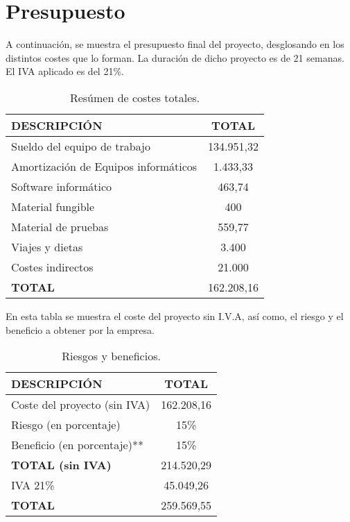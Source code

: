 \section{Presupuesto}

\par A continuación, se muestra el presupuesto final del proyecto, desglosando en los distintos costes que lo forman. La duración de dicho proyecto es de 21 semanas. El IVA aplicado es del 21\%.



\begin{table}[H]
\begin{center}
\begin{tabular}{l c}
\textbf{DESCRIPCIÓN} & \textbf{TOTAL}\\ \hline \hline
Sueldo del equipo de trabajo & 134.951,32\\
Amortización de Equipos informáticos & 1.433,33\\
Software informático & 463,74\\
Material fungible & 400\\
Material de pruebas & 559,77\\
Viajes y dietas & 3.400\\
Costes indirectos & 21.000\\ \hline \hline
\textbf{TOTAL} & 162.208,16\\ \hline
\end{tabular}
\caption{Resúmen de costes totales.}
\label{tab:resumenTotal}
\end{center}
\end{table}

En esta tabla se muestra el coste del proyecto sin I.V.A, así como, el riesgo y el beneficio a obtener por la empresa.
\begin{table}[H]
\begin{center}
\begin{tabular}{l c}
\textbf{DESCRIPCIÓN} & \textbf{TOTAL}\\ \hline \hline
Coste del proyecto (sin IVA) & 162.208,16\\
Riesgo (en porcentaje) & 15\% \\
Beneficio (en porcentaje)** & 15\% \\ \hline \hline
\textbf{TOTAL (sin IVA)} & 214.520,29\\ \hline \hline
IVA 21\% & 45.049,26 \\\hline \hline
\textbf{TOTAL} & 259.569,55\\ \hline
\end{tabular}
\caption{Riesgos y beneficios.}
\label{tab:total}
\end{center}
\end{table}



